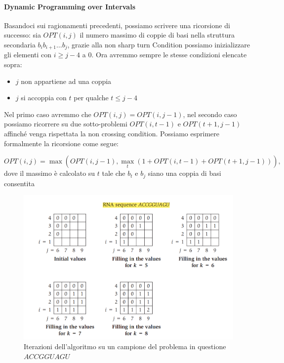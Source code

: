 \paragraph{Dynamic Programming over Intervals}
Basandoci sui ragionamenti precedenti, possiamo scrivere una ricorsione di
successo: sia $OPT(i,j)$ il numero massimo di coppie di basi nella struttura
secondaria $b_i b_{i+1} \ldots b_j$, grazie alla non sharp turn Condition
possiamo inizializzare gli elementi con $i \geq j -4$ a $0$. Ora avremmo sempre
le stesse condizioni elencate sopra:

\begin{itemize}
    \item $j$ non appartiene ad una coppia
    \item $j$ si accoppia con $t$ per qualche $t \leq j - 4$
\end{itemize}

Nel primo caso avremmo che $OPT(i,j) = OPT(i, j-1)$, nel secondo caso possiamo
ricorrere su due sotto-problemi $OPT(i, t-1)$ e $OPT(t+1, j-1)$ affinché venga
rispettata la non crossing condition. Possiamo esprimere formalmente la
ricorsione come segue:

\begin{center}
    \[
        OPT(i, j) = \max(OPT(i, j-1), \max_t(1+OPT(i, t-1)+OPT(t+1, j-1))),
    \]
    dove il massimo è calcolato su $t$ tale che $b_t$ e $b_j$ siano una coppia di
    basi consentita
\end{center}

\begin{figure}[H]
    \centering
    \includegraphics[width=\textwidth, keepaspectratio]{capitoli/dynamic_programming/imgs/rna_calcolo.png}
    \caption{Iterazioni dell'algoritmo su un campione del problema in questione $ACCGGUAGU$}
\end{figure}
\newpage

